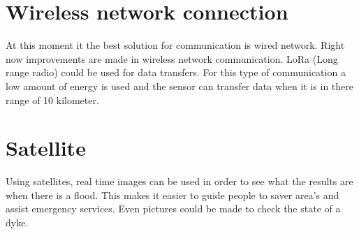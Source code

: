 \section{Wireless network connection} 
At this moment it the best solution for communication is wired network. Right now improvements are made in wireless network communication. LoRa (Long range radio) could be used for data transfers. For this type of communication a low amount of energy is used and the sensor can transfer data when it is in there range of 10 kilometer.

\section{Satellite}
Using satellites, real time images can be used in order to see what the results are when there is a flood. This makes it easier to guide people to saver area's and assist emergency services. Even pictures could be made to check the state of a dyke.





